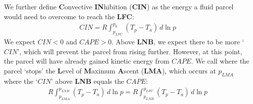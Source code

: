 We further define \textbf{C}onvective \textbf{IN}hibition (\textbf{CIN}) as the energy a fluid parcel would need to overcome to reach the \textbf{LFC}:
\begin{align*}
    \boxed{CIN = R\int_{p_{LFC}}^{p_{0}}\left( T_p-T_a \right)\,d\ln p}
\end{align*}
We expect \(CIN<0\) and \(CAPE>0\). Above \textbf{LNB}, we expect there to be more `\(CIN\)', which will prevent the parcel from rising further. However, at this point, the parcel will have already gained kinetic energy from \(CAPE\). We call where the parcel `stops' the \textbf{L}evel of \textbf{M}aximum \textbf{A}scent (\textbf{LMA}), which occurs at \(p_{LMA}\) where the `\(CIN\)' above \textbf{LNB} equals the \(CAPE\):
\begin{align*}
    \boxed{
        R\int_{p_{LMA}}^{p_{LNB}}\left( T_p-T_a \right)\,d\ln p = 
        R\int_{p_{LNB}}^{p_{LFC}}\left( T_p-T_a \right)\,d\ln p
    }
\end{align*}

